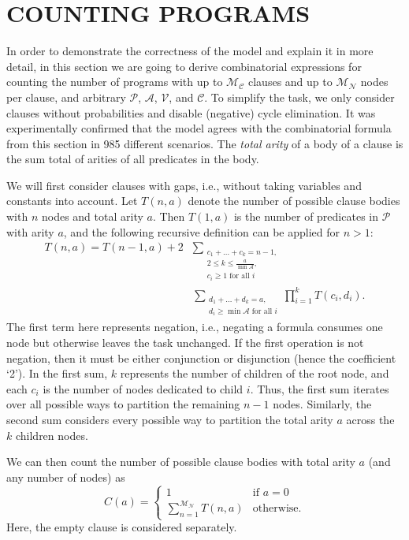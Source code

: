 \documentclass[letterpaper]{article}
\theoremstyle{definition}
\newcommand{\predicates}{\mathcal{P}}
\newcommand{\variables}{\mathcal{V}}
\newcommand{\constants}{\mathcal{C}}
\newcommand{\arities}{\mathcal{A}}
\newcommand{\maxNumNodes}{\mathcal{M}_{\mathcal{N}}}
\newcommand{\maxNumClauses}{\mathcal{M}_{\mathcal{C}}}
\begin{document}
\section{COUNTING PROGRAMS} \label{sec:counting}

In order to demonstrate the correctness of the model and explain it in more
detail, in this section we are going to derive combinatorial expressions for
counting the number of programs with up to $\maxNumClauses{}$ clauses and up to
$\maxNumNodes{}$ nodes per clause, and arbitrary $\predicates{}$,
$\arities{}$, $\variables{}$, and $\constants{}$. To simplify the task, we only
consider clauses without probabilities and disable (negative) cycle elimination.
It was experimentally confirmed that the model agrees with the combinatorial
formula from this section in 985 different scenarios. The \emph{total arity} of
a body of a clause is the sum total of arities of all predicates in the body.

We will first consider clauses with gaps, i.e., without taking variables and
constants into account. Let $T(n, a)$ denote the number of possible clause
bodies with $n$ nodes and total arity $a$. Then $T(1, a)$ is the number of
predicates in $\predicates{}$ with arity $a$, and the following recursive
definition can be applied for $n > 1$:
\begin{align*}
  T(n, a) = T(n-1, a) + 2&\sum_{\substack{c_1 + \dots + c_k = n - 1,\\
      2 \le k \le \frac{a}{\min \arities{}},\\
  c_i \ge 1 \text{ for all } i}}\\
  &\sum_{\substack{d_1 + \dots + d_k = a,\\
  d_i \ge \min \arities{} \text{ for all } i}} \prod_{i=1}^k T(c_i, d_i).
\end{align*}
The first term here represents negation, i.e., negating a formula consumes
one node but otherwise leaves the task unchanged. If the first operation is not
negation, then it must be either conjunction or disjunction (hence the
coefficient `2'). In the first sum, $k$ represents the number of children of the
root node, and each $c_i$ is the number of nodes dedicated to child $i$. Thus,
the first sum iterates over all possible ways to partition the remaining $n-1$
nodes. Similarly, the second sum considers every possible way to partition the
total arity $a$ across the $k$ children nodes.

We can then count the number of possible clause bodies with total arity $a$ (and
any number of nodes) as
\[
  C(a) = \begin{cases}
    1 & \text{if } a = 0\\
    \sum_{n=1}^{\maxNumNodes{}} T(n, a) & \text{otherwise.}
  \end{cases}
\]
Here, the empty clause is considered separately.
\end{document}
